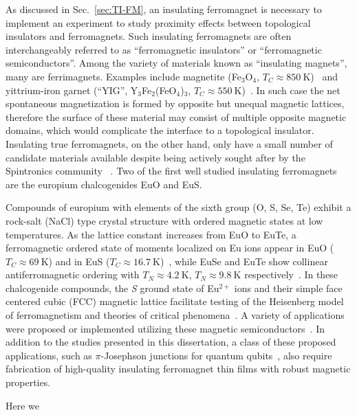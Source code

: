 As discussed in Sec.~\ref{sec:TI-FM}, an insulating ferromagnet is necessary to implement an experiment to study proximity effects between topological insulators and ferromagnets. Such insulating ferromagnets are often interchangeably referred to as ``ferromagnetic insulators'' or ``ferromagnetic semiconductors''. Among the variety of materials known as ``insulating magnets'', many are ferrimagnets. Examples include magnetite (Fe$_3$O$_4$, $T_C\approx850~\mathrm{K}$)~\cite{Neel1948} and yittrium-iron garnet (``YIG'', Y$_3$Fe$_2$(FeO$_4$)$_3$, $T_C\approx550~\mathrm{K}$)~\cite{YIG}. In such case the net spontaneous magnetization is formed by opposite but unequal magnetic lattices, therefore the surface of these material may consist of multiple opposite magnetic domains, which would complicate the interface to a topological insulator. Insulating true ferromagnets, on the other hand, only have a small number of candidate materials available despite being actively sought after by the Spintronics community \cite[][p.~329]{kittel}~\cite{Yi2014, Wolf2001}. Two of the first well studied insulating ferromagnets are the europium chalcogenides EuO and EuS.

Compounds of europium with elements of the sixth group (O, S, Se, Te) exhibit a rock-salt (NaCl) type crystal structure with ordered magnetic states at low temperatures. As the lattice constant increases from EuO to EuTe, a ferromagnetic ordered state of moments localized on Eu ions appear in EuO ($T_C\approx69~\mathrm{K}$) and in EuS ($T_C\approx16.7~\mathrm{K}$)~\cite{EuO_TC, EuS_Shafer}, while EuSe and EuTe show collinear antiferromagnetic ordering with $T_N\approx4.2~\mathrm{K}$, $T_N\approx9.8~\mathrm{K}$ respectively~\cite{EuSe_AF, EuTe_AF}. In these chalcogenide compounds, the \textit{S} ground state of Eu$^{2+}$ ions and their simple face centered cubic (FCC) magnetic lattice facilitate testing of the Heisenberg model of ferromagnetism and theories of critical phenomena~\cite{divalent_Eu,  EuS_neighbor_exchange, EuS_critical, EuS_neutron, EuS_spin_wave}. A variety of applications were proposed or implemented utilizing these magnetic semiconductors~\cite{EuS_spin_filter, EuS_app1, EuS_spin_filter2}. In addition to the studies presented in this dissertation, a class of these proposed applications, such as $\pi$-Josephson junctions for quantum qubits~\cite{pi_qubit, pi_junction, Jing}, also require fabrication of high-quality insulating ferromagnet thin films with robust magnetic properties.

Here we
